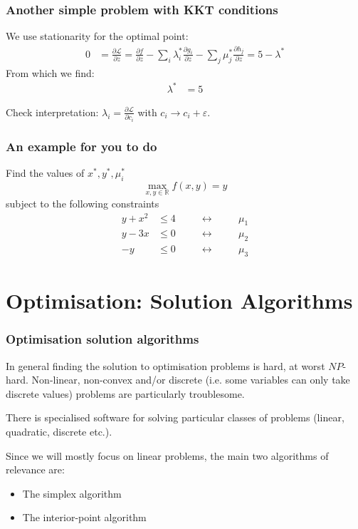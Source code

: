 \documentclass[10pt,aspectratio=169,dvipsnames]{beamer}
\def\l{\lambda}
\def\m{\mu}
\def\d{\partial}
\def\cL{\mathcal{L}}
\let\olditem\item
\renewcommand{\item}{%
\olditem\vspace{5pt}}
\begin{document}
\begin{frame}
  \frametitle{Another simple problem with KKT conditions}

  We use stationarity for the optimal point:
  \begin{align*}
    0 & = \frac{\d \cL}{\d z } =   \frac{\d f}{\d z} - \sum_i \l_i^* \frac{\d g_i}{\d z}  - \sum_j \m_j^* \frac{\d h_j}{\d z} = 5 - \l^*
  \end{align*}
  From which we find:
  \begin{align*}
    \l^* & = 5
  \end{align*}

  Check interpretation: $\l_i = \frac{\d \cL}{\d c_i}$ with $c_i \to c_i + \varepsilon$.
\end{frame}


\begin{frame}
  \frametitle{An example for you to do}

  Find the values of $x^*,y^*,\m_i^*$
  \begin{equation*}
    \max_{x,y\in \mathbb{R}} f(x,y) = y
  \end{equation*}
  subject to the following constraints
  \begin{align*}
    y + x^2 & \leq 4  \hspace{1cm}\leftrightarrow\hspace{1cm} \m_1 \\
    y - 3x & \leq 0  \hspace{1cm}\leftrightarrow\hspace{1cm} \m_2\\
    -y & \leq 0  \hspace{1cm}\leftrightarrow\hspace{1cm} \m_3
  \end{align*}
\end{frame}


\section{Optimisation: Solution Algorithms}


\begin{frame}
  \frametitle{Optimisation solution algorithms}

  In general finding the solution to optimisation problems is hard,
  at worst $NP$-hard. Non-linear,
  non-convex and/or discrete (i.e. some variables can only take
  discrete values) problems are particularly troublesome.

  There is specialised software for solving particular classes of
  problems (linear, quadratic, discrete etc.).

  Since we will mostly focus on linear problems, the main two
  algorithms of relevance are:
  \begin{itemize}
  \item The \alert{simplex algorithm}
  \item The \alert{interior-point algorithm}
  \end{itemize}

\end{frame}
\end{document}
